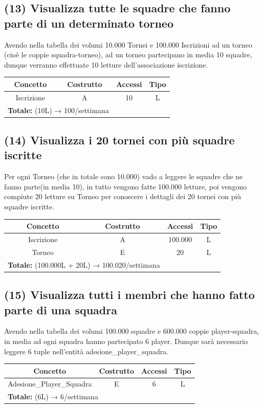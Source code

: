 \documentclass[a4paper,12pt]{report}
\begin{document}
\subsection*{(13)  Visualizza tutte le squadre che fanno parte di un determinato torneo}
Avendo nella tabella dei volumi 10.000 Tornei e 100.000 Iscrizioni ad un torneo (cioè le coppie squadra-torneo), ad un torneo partecipano in media 10 squadre, dunque verranno effettuate 10 letture dell'associazione iscrizione.
\begin{center}
	\begin{tabular}{|c|c|c|c|}
		\hline\rowcolor{pink}
		Concetto & Costrutto & Accessi & Tipo\\
		\hline\hline		
		Iscrizione & A & 10 & L\\
		\hline
		\multicolumn{2}{l}{%
			\textbf{Totale:} (10L) → 100/settimana} \\
		\hline
	\end{tabular}
\end{center}
\subsection*{(14)  Visualizza i 20 tornei con più squadre iscritte}
Per ogni Torneo (che in totale sono 10.000) vado a leggere le squadre che ne fanno parte(in media 10), in tutto vengono fatte 100.000 letture, poi vengono compiute 20 letture su Torneo per conoscere i dettagli dei 20 tornei con più squadre iscritte.
\begin{center}
	\begin{tabular}{|c|c|c|c|}
		\hline\rowcolor{pink}
		Concetto & Costrutto & Accessi & Tipo\\
		\hline\hline		
		Iscrizione & A & 100.000 & L\\
		\hline
		Torneo & E & 20 & L\\
		\hline
		\multicolumn{2}{l}{%
			\textbf{Totale:} (100.000L + 20L) → 100.020/settimana} \\
		\hline
	\end{tabular}
\end{center}
\subsection*{(15)  Visualizza tutti i membri che hanno fatto parte di una squadra}
Avendo nella tabella dei volumi 100.000 squadre e 600.000 coppie player-squadra, in media ad ogni squadra hanno partecipato 6 player. Dunque sarà necessario leggere 6 tuple nell'entità adesione\_player\_squadra.
\begin{center}
	\begin{tabular}{|c|c|c|c|}
		\hline\rowcolor{pink}
		Concetto & Costrutto & Accessi & Tipo\\
		\hline\hline		
		Adesione\_Player\_Squadra & E & 6 & L\\
		\hline
		\multicolumn{2}{l}{%
			\textbf{Totale:} (6L) → 6/settimana} \\
		\hline
	\end{tabular}
\end{center}
\end{document}

